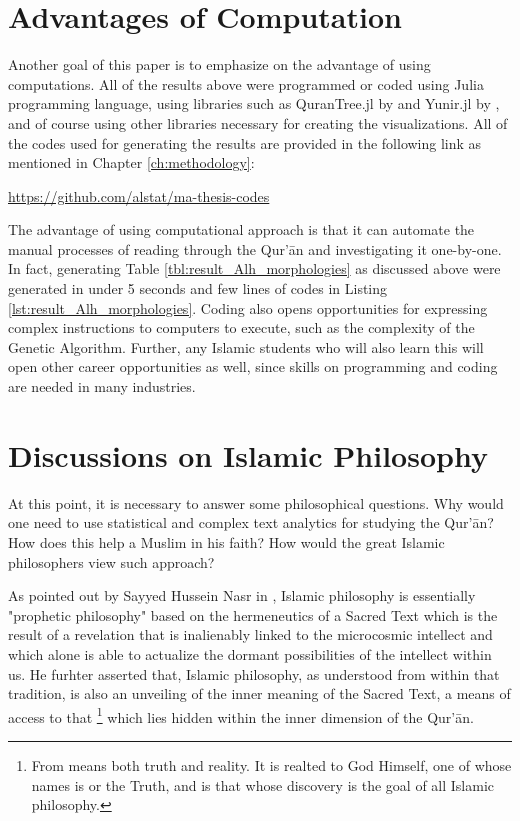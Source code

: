 \section{Advantages of Computation}
Another goal of this paper is to emphasize on the advantage of using computations. All of the results above were programmed or coded using Julia programming language, using libraries such as QuranTree.jl by  and Yunir.jl by , and of course using other libraries necessary for creating the visualizations. All of the codes used for generating the results are provided in the following link as mentioned in Chapter \ref{ch:methodology}:
\begin{center}
\url{https://github.com/alstat/ma-thesis-codes}
\end{center}
The advantage of using computational approach is that it can automate the manual processes of reading through the Qur'\=an and investigating it one-by-one. In fact, generating Table \ref{tbl:result_Alh_morphologies} as discussed above were generated in under 5 seconds and few lines of codes in Listing \ref{lst:result_Alh_morphologies}. Coding also opens opportunities for expressing complex instructions to computers to execute, such as the complexity of the Genetic Algorithm. Further, any Islamic students who will also learn this will open other career opportunities as well, since skills on programming and coding are needed in many industries.
\section{Discussions on Islamic Philosophy}\label{sec:result_islamic_philosophy}
At this point, it is necessary to answer some philosophical questions. Why would one need to use statistical and complex text analytics for studying the Qur'\=an? How does this help a Muslim in his faith? How would the great Islamic philosophers view such approach?

As pointed out by Sayyed Hussein Nasr in \cite{nasr2013history}, Islamic philosophy is essentially "prophetic philosophy" based on the hermeneutics of a Sacred Text which is the result of a revelation that is inalienably linked to the microcosmic intellect and which alone is able to actualize the dormant possibilities of the intellect within us. He furhter asserted that, Islamic philosophy, as understood from within that tradition, is also an unveiling of the inner meaning of the Sacred Text, a means of access to that  \footnote{From \cite{nasr2013history}   means both truth and reality. It is realted to God Himself, one of whose names is   or the Truth, and is that whose discovery is the goal of all Islamic philosophy.} which lies hidden within the inner dimension of the Qur'\=an.

